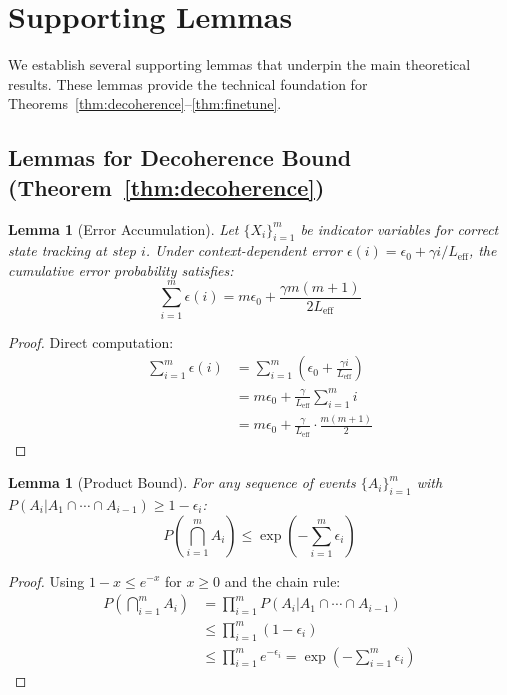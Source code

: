 \documentclass{article}
\theoremstyle{plain}
\newtheorem{lemma}[theorem]{Lemma}
\theoremstyle{definition}
\theoremstyle{remark}
\newcommand{\Leff}{L_{\mathrm{eff}}}
\begin{document}

\section{Supporting Lemmas}
\label{app:lemmas}

We establish several supporting lemmas that underpin the main theoretical results. These lemmas provide the technical foundation for Theorems~\ref{thm:decoherence}--\ref{thm:finetune}.

\subsection{Lemmas for Decoherence Bound (Theorem~\ref{thm:decoherence})}

\begin{lemma}[Error Accumulation]
\label{lem:error_accum}
Let $\{X_i\}_{i=1}^m$ be indicator variables for correct state tracking at step $i$. Under context-dependent error $\epsilon(i) = \epsilon_0 + \gamma i/\Leff$, the cumulative error probability satisfies:
\begin{equation}
\sum_{i=1}^{m} \epsilon(i) = m\epsilon_0 + \frac{\gamma m(m+1)}{2\Leff}
\end{equation}
\end{lemma}

\begin{proof}
Direct computation:
\begin{align}
\sum_{i=1}^{m} \epsilon(i) &= \sum_{i=1}^{m} \left(\epsilon_0 + \frac{\gamma i}{\Leff}\right) \\
&= m\epsilon_0 + \frac{\gamma}{\Leff}\sum_{i=1}^{m} i \\
&= m\epsilon_0 + \frac{\gamma}{\Leff} \cdot \frac{m(m+1)}{2}
\end{align}
\end{proof}

\begin{lemma}[Product Bound]
\label{lem:product}
For any sequence of events $\{A_i\}_{i=1}^m$ with $P(A_i | A_1 \cap \cdots \cap A_{i-1}) \geq 1 - \epsilon_i$:
\begin{equation}
P\left(\bigcap_{i=1}^m A_i\right) \leq \exp\left(-\sum_{i=1}^m \epsilon_i\right)
\end{equation}
\end{lemma}

\begin{proof}
Using $1-x \leq e^{-x}$ for $x \geq 0$ and the chain rule:
\begin{align}
P\left(\bigcap_{i=1}^m A_i\right) &= \prod_{i=1}^m P(A_i | A_1 \cap \cdots \cap A_{i-1}) \\
&\leq \prod_{i=1}^m (1 - \epsilon_i) \\
&\leq \prod_{i=1}^m e^{-\epsilon_i} = \exp\left(-\sum_{i=1}^m \epsilon_i\right)
\end{align}
\end{proof}
\end{document}

